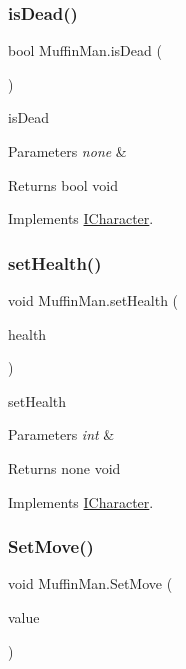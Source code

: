 \subsubsection{\texorpdfstring{is\+Dead()}{isDead()}}
{\footnotesize\ttfamily bool Muffin\+Man.\+is\+Dead (\begin{DoxyParamCaption}{ }\end{DoxyParamCaption})\hspace{0.3cm}{\ttfamily [inline]}}

is\+Dead 
\begin{DoxyParams}{Parameters}
{\em none} & \\
\hline
\end{DoxyParams}
\begin{DoxyReturn}{Returns}
bool void 
\end{DoxyReturn}


Implements \mbox{\hyperlink{interface_i_character}{I\+Character}}.

\mbox{\label{class_muffin_man_a4990952946d39102b3034ee93f70f20d}} 
\subsubsection{\texorpdfstring{set\+Health()}{setHealth()}}
{\footnotesize\ttfamily void Muffin\+Man.\+set\+Health (\begin{DoxyParamCaption}\item[{int}]{health }\end{DoxyParamCaption})\hspace{0.3cm}{\ttfamily [inline]}}

set\+Health 
\begin{DoxyParams}{Parameters}
{\em int} & \\
\hline
\end{DoxyParams}
\begin{DoxyReturn}{Returns}
none void 
\end{DoxyReturn}


Implements \mbox{\hyperlink{interface_i_character}{I\+Character}}.

\mbox{\label{class_muffin_man_aa693b638b6e52ab4fed01d7113b58ca8}} 
\subsubsection{\texorpdfstring{Set\+Move()}{SetMove()}}
{\footnotesize\ttfamily void Muffin\+Man.\+Set\+Move (\begin{DoxyParamCaption}\item[{bool}]{value }\end{DoxyParamCaption})\hspace{0.3cm}{\ttfamily [inline]}}

